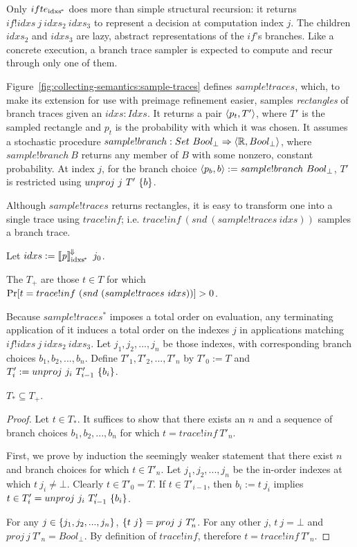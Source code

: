 Only $ifte_\mathrm{idxs^{\mspace{-2mu}*}}$ does more than simple structural recursion: it returns $if!idxs~j~idxs_2~idxs_3$ to represent a decision at computation index $j$.
The children $idxs_2$ and $idxs_3$ are lazy, abstract representations of the $if$'s branches.
Like a concrete execution, a branch trace sampler is expected to compute and recur through only one of them.

Figure~\ref{fig:collecting-semantics:sample-traces} defines $sample!traces$, which, to make its extension for use with preimage refinement easier, samples \emph{rectangles} of branch traces given an $idxs : Idxs$.
It returns a pair $\langle{p_t,T'}\rangle$, where $T'$ is the sampled rectangle and $p_t$ is the probability with which it was chosen.
It assumes a stochastic procedure $sample!branch : Set~Bool_\bot \Rightarrow \langle{\mathbb{R},Bool_\bot}\rangle$, where $sample!branch~B$ returns any member of $B$ with some nonzero, constant probability.
At index $j$, for the branch choice $\langle{p_b,b}\rangle := sample!branch~Bool_\bot$, $T'$ is restricted using $unproj~j~T'~\{{b}\}$.

Although $sample!traces$ returns rectangles, it is easy to transform one into a single trace using $trace!inf$; i.e. $trace!inf~(snd~(sample!traces~idxs))$ samples a branch trace.

Let $idxs := \left\llbracket{\mathit{p}}\right\rrbracket^{\mspace{-2mu}\Downarrow\mspace{-2mu}}_\mathrm{idxs^{\mspace{-2mu}*}}~j_0$.

\begin{definition}
The  $T_+$ are those $t \in T$ for which $\mathrm{Pr}\!\left[{t = trace!inf~(snd~(sample!traces~idxs))}\right] > 0$.
\end{definition}

Because $sample!traces^*$ imposes a total order on evaluation, any terminating application of it induces a total order on the indexes $j$ in applications matching $if!idxs~j~idxs_2~idxs_3$.
Let $j_1, j_2, ..., j_n$ be those indexes, with corresponding branch choices $b_1,b_2,...,b_n$.
Define $T'_1,T'_2,...,T'_n$ by $T'_0 := T$ and $T'_i := unproj~j_i~T'_{i-1}~\{{b_i}\}$.

\begin{theorem}
$T_* \subseteq T_+$.
\end{theorem}
\begin{proof}
Let $t \in T_*$.
It suffices to show that there exists an $n$ and a sequence of branch choices $b_1,b_2,...,b_n$ for which $t = trace!inf~T'_n$.

First, we prove by induction the seemingly weaker statement that there exist $n$ and branch choices for which $t \in T'_n$.
Let $j_1,j_2,...,j_n$ be the in-order indexes at which $t~j_i \neq \bot$.
Clearly $t \in T'_0 = T$.
If $t \in T'_{i-1}$, then $b_i := t~j_i$ implies $t \in T'_i = unproj~j_i~T'_{i-1}~\{{b_i}\}$.

For any $j \in \{{j_1,j_2,...,j_n}\}$, $\{{t~j}\} = proj~j~T'_n$.
For any other $j$, $t~j = \bot$ and $proj~j~T'_n = Bool_\bot$.
By definition of $trace!inf$, therefore $t = trace!inf~T'_n$.
\end{proof}

